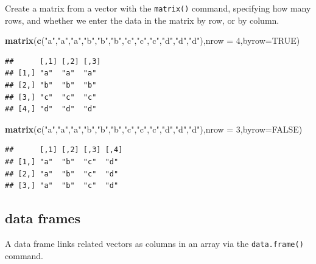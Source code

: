 \documentclass[
]{book}
\newenvironment{Shaded}{\begin{snugshade}}{\end{snugshade}}
\newcommand{\AttributeTok}[1]{\textcolor[rgb]{0.13,0.29,0.53}{#1}}
\newcommand{\ConstantTok}[1]{\textcolor[rgb]{0.56,0.35,0.01}{#1}}
\newcommand{\DecValTok}[1]{\textcolor[rgb]{0.00,0.00,0.81}{#1}}
\newcommand{\FunctionTok}[1]{\textcolor[rgb]{0.13,0.29,0.53}{\textbf{#1}}}
\newcommand{\NormalTok}[1]{#1}
\newcommand{\StringTok}[1]{\textcolor[rgb]{0.31,0.60,0.02}{#1}}
\theoremstyle{definition}
\theoremstyle{definition}
\theoremstyle{definition}
\theoremstyle{definition}
\theoremstyle{remark}
\begin{document}
Create a matrix from a vector with the \texttt{matrix()} command, specifying how many rows, and whether we enter the data in the matrix by row, or by column.

\begin{Shaded}
\begin{Highlighting}[]
\FunctionTok{matrix}\NormalTok{(}\FunctionTok{c}\NormalTok{(}\StringTok{"a"}\NormalTok{,}\StringTok{"a"}\NormalTok{,}\StringTok{"a"}\NormalTok{,}\StringTok{"b"}\NormalTok{,}\StringTok{"b"}\NormalTok{,}\StringTok{"b"}\NormalTok{,}\StringTok{"c"}\NormalTok{,}\StringTok{"c"}\NormalTok{,}\StringTok{"c"}\NormalTok{,}\StringTok{"d"}\NormalTok{,}\StringTok{"d"}\NormalTok{,}\StringTok{"d"}\NormalTok{),}\AttributeTok{nrow =} \DecValTok{4}\NormalTok{,}\AttributeTok{byrow=}\ConstantTok{TRUE}\NormalTok{)}
\end{Highlighting}
\end{Shaded}

\begin{verbatim}
##      [,1] [,2] [,3]
## [1,] "a"  "a"  "a" 
## [2,] "b"  "b"  "b" 
## [3,] "c"  "c"  "c" 
## [4,] "d"  "d"  "d"
\end{verbatim}

\begin{Shaded}
\begin{Highlighting}[]
\FunctionTok{matrix}\NormalTok{(}\FunctionTok{c}\NormalTok{(}\StringTok{"a"}\NormalTok{,}\StringTok{"a"}\NormalTok{,}\StringTok{"a"}\NormalTok{,}\StringTok{"b"}\NormalTok{,}\StringTok{"b"}\NormalTok{,}\StringTok{"b"}\NormalTok{,}\StringTok{"c"}\NormalTok{,}\StringTok{"c"}\NormalTok{,}\StringTok{"c"}\NormalTok{,}\StringTok{"d"}\NormalTok{,}\StringTok{"d"}\NormalTok{,}\StringTok{"d"}\NormalTok{),}\AttributeTok{nrow =} \DecValTok{3}\NormalTok{,}\AttributeTok{byrow=}\ConstantTok{FALSE}\NormalTok{)}
\end{Highlighting}
\end{Shaded}

\begin{verbatim}
##      [,1] [,2] [,3] [,4]
## [1,] "a"  "b"  "c"  "d" 
## [2,] "a"  "b"  "c"  "d" 
## [3,] "a"  "b"  "c"  "d"
\end{verbatim}

\subsection*{data frames}\label{data-frames}

A data frame links related vectors as columns in an array via the \texttt{data.frame()} command.
\end{document}

